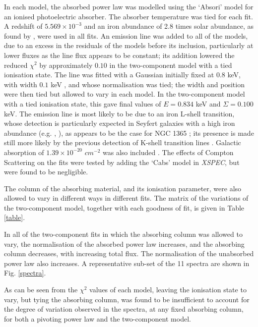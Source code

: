 \documentclass[useAMS,usenatbib]{sam}
\begin{document}
In each model, the absorbed power law was modelled using the `Absori' model for an ionised photoelectric absorber. The absorber temperature was tied for each fit. A
redshift of $5.569 \times 10^{−3}$ \citep{lavaux} and an iron abundance of 2.8 times solar abundance, as found by \citet{risaliti09}, were used in all fits. An emission
line was added to all of the models, due to an excess in the residuals of the models before its inclusion, particularly at lower fluxes as the line flux appears to be
constant; its addition lowered the reduced $\chi^2$ by approximately $0.10$ in the two-component model with a tied ionisation state. The line was fitted with a Gaussian
initially fixed at $0.8$ keV, with width $0.1$ keV , and whose normalisation was tied; the width and position were then tied but allowed to vary in each model. In the
two-component model with a tied ionisation state, this gave final values of $E = 0.834$ keV and $\Sigma = 0.100$ keV. The emission line is most likely to be due to an
iron L-shell transition, whose detection is particularly expected in Seyfert galaxies with a high iron abundance (e.g. \citet{markowitz}, \citet{fabian09}), as appears to
be the case for NGC 1365 \citep{risaliti09}; its presence is made still more likely by the previous detection of K-shell transition lines \citep{risaliti05a}. Galactic
absorption of $1.39 \times 10^{−20}$ $cm^{-2}$ was also included \citep{dickey90}. The effects of Compton Scattering on the fits were tested by adding the `Cabs' model in
{\it XSPEC}, but were found to be negligible.

The column of the absorbing material, and its ionisation parameter, were also allowed to vary in different ways in different fits. The matrix of the variations
of the two-component model, together with each goodness of fit, is given in Table \ref{table}.

In all of the two-component fits in which the absorbing column was allowed to vary, the normalisation of the absorbed power law increases, and the absorbing column
decreases, with increasing total flux. The normalisation of the unabsorbed power law also increases. A representative sub-set of the 11 spectra are shown in Fig.
\ref{spectra}.

As can be seen from the $\chi^2$ values of each model, leaving the ionisation state to vary, but tying the absorbing column, was found to be insufficient to account for
the degree of variation observed in the spectra, at any fixed absorbing column, for both a pivoting power law and the two-component model. 
\end{document}
